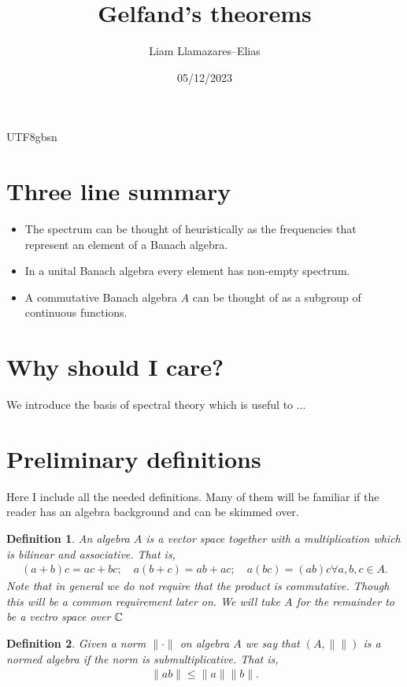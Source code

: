 \documentclass[12pt]{article}
\newtheorem{definition}{Definition}
\renewcommand{\norm}[1]{\lVert #1 \rVert}\renewcommand{\abs}[1]{\left| #1 \right|}
\begin{document}
\begin{CJK*}{UTF8}{gbsn}
	\title{Gelfand's theorems}
	\author{Liam Llamazares--Elias}
	\date{05/12/2023}
	\maketitle
	\section{ Three line summary}
	\begin{itemize}
		\item The spectrum can be thought of heuristically as the frequencies that represent an element of a Banach algebra.
		\item In a unital Banach algebra every element has non-empty spectrum.
		\item A commutative Banach algebra $A$ can be thought of as a subgroup of continuous functions.
	\end{itemize}
	\section{Why should I care?}
	We introduce the basis of spectral theory which is useful to ...
	\section{Preliminary definitions}
	Here I include all the needed definitions. Many of them will be familiar if the reader has an algebra background and can be skimmed over.
	\begin{definition}
		An \emph{algebra} $A$ is a vector space together with a multiplication which is bilinear and associative. That is,
		\begin{align*}
			(a+b)c=ac+bc;\quad a(b+c)=ab+ac; \quad a(bc)=(ab)c \forall a,b,c \in A.
		\end{align*}
		Note that in general we do not require that the product is commutative. Though this will be a common requirement later on. We will take $A$ for the remainder to be a vectro space over  $\mathbb{C}$
	\end{definition}
	\begin{definition}
		Given a norm $\norm{\cdot }$ on algebra $A$ we say that $(A, \norm{})$ is a \emph{ normed algebra} if the norm is \emph{ submultiplicative}. That is,
		\begin{align*}
			\norm{ab}\leq \norm{a}\norm{b} .
		\end{align*}


\end{definition}
\end{CJK*}
\end{document}
